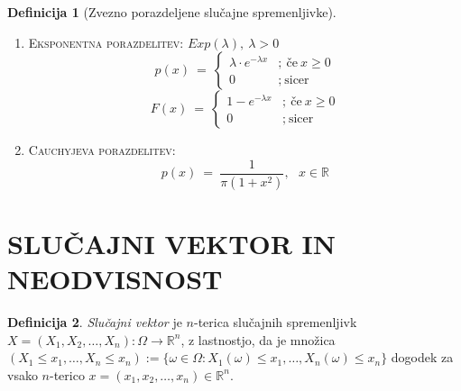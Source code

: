 \documentclass[11pt]{article}
\theoremstyle{definition}
\newtheorem{definicija}{Definicija}[section]
\theoremstyle{definition}
\theoremstyle{definition}
\begin{document}
\begin{definicija}[Zvezno porazdeljene slučajne spremenljivke]
\begin{enumerate}
	\item \textsc{Eksponentna porazdelitev}: $Exp(\lambda), ~\lambda > 0$
	$$p(x) ~=~ \begin{cases}
		\lambda \cdot e^{-\lambda x} &; ~\text{če}~ x \geq 0 \\
		0 &; ~\text{sicer}~
	\end{cases}$$
	$$F(x) ~=~ \begin{cases}
		1 - e^{-\lambda x} &; ~\text{če}~ x \geq 0 \\
		0 &; ~\text{sicer}
	\end{cases}$$
	
	\item \textsc{Cauchyjeva porazdelitev}:
	$$p(x) ~=~ \frac{1}{\pi (1 + x^2)}, ~~~x \in \mathbb{R}$$
\end{enumerate}

\end{definicija}
\vspace{0.5cm}

\pagebreak


\section{SLUČAJNI VEKTOR IN NEODVISNOST}
\vspace{0.5cm}

\begin{definicija}

\textit{Slučajni vektor} je $n$-terica slučajnih spremenljivk \\$X = (X_1, X_2, \ldots, X_n): \Omega \rightarrow \mathbb{R}^n$, z lastnostjo, da je množica \\$(X_1 \leq x_1, \ldots, X_n \leq x_n) := \{ \omega \in \Omega: X_1(\omega) \leq x_1, \ldots, X_n(\omega) \leq x_n \}$ dogodek za vsako $n$-terico $x = (x_1, x_2, \ldots, x_n) \in \mathbb{R}^n$.

\end{definicija}
\vspace{0.5cm}
\end{document}

